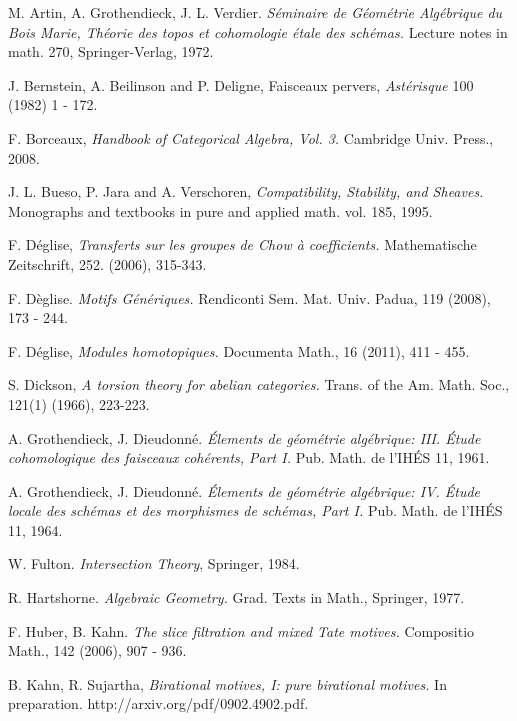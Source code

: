 \newpage

\begin{thebibliography}{10}

M. Artin, A. Grothendieck, J. L. Verdier.
{\em S\'eminaire de G\'eom\'etrie Alg\'ebrique du Bois Marie,
Th\'eorie des topos et cohomologie \'etale des sch\'emas.}
Lecture notes in math. 270, Springer-Verlag, 1972.

J. Bernstein, A. Beilinson and P. Deligne,
Faisceaux pervers, {\em Ast\'erisque} 100 (1982) 1 - 172.

F. Borceaux,
{\em Handbook of Categorical Algebra, Vol. 3.}
Cambridge Univ. Press., 2008.

J. L. Bueso, P. Jara and A. Verschoren,
{\em Compatibility, Stability, and Sheaves.}
Monographs and textbooks in pure and applied math. vol. 185,
1995.

F. D\'eglise,
\emph{Transferts sur les groupes de Chow \`a coefficients.}
Mathematische Zeitschrift, 252. (2006), 315-343.

F. D\`eglise.
\emph{Motifs G\'en\'eriques.}
Rendiconti Sem. Mat. Univ. Padua, 119 (2008), 173 - 244.

F. D\'eglise, 
\emph{Modules homotopiques.}
Documenta Math.,
16 (2011), 411 - 455.

S. Dickson,
\emph{A torsion theory for abelian categories.}
Trans. of the Am. Math. Soc., 121(1) (1966), 223-223.

A. Grothendieck, J. Dieudonn\'e.
{\em \'Elements de g\'eom\'etrie alg\'ebrique: III. \'Etude 
cohomologique des faisceaux coh\'erents, Part I.} 
Pub. Math. de l'IH\'ES 11, 1961.

A. Grothendieck, J. Dieudonn\'e.
\emph{\'Elements de g\'eom\'etrie alg\'ebrique: IV. \'Etude locale 
des sch\'emas et des morphismes de sch\'emas, Part I.}
Pub. Math. de l'IH\'ES 11, 1964.

W. Fulton.
\emph{Intersection Theory},
Springer, 1984.

R. Hartshorne.
\emph{Algebraic Geometry.}
Grad. Texts in Math.,
Springer, 1977.

F. Huber, B. Kahn.
\emph{The slice filtration and mixed Tate motives.}
Compositio Math., 142 (2006), 907 - 936.

B. Kahn, R. Sujartha,
\emph{Birational motives, I: pure birational motives.}
In preparation.
http://arxiv.org/pdf/0902.4902.pdf.


\end{thebibliography}
